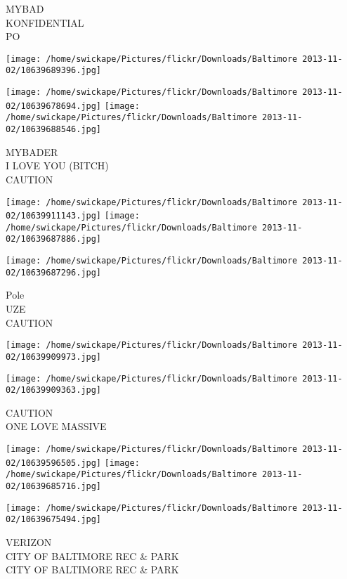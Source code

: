 \documentclass[10pt,letterpaper]{article}
\begin{document}
MYBAD\\
KONFIDENTIAL\\
PO
\pagebreak

\texttt{[image: /home/swickape/Pictures/flickr/Downloads/Baltimore 2013-11-02/10639689396.jpg]}

\vspace{0.25in}
\texttt{[image: /home/swickape/Pictures/flickr/Downloads/Baltimore 2013-11-02/10639678694.jpg]}
\texttt{[image: /home/swickape/Pictures/flickr/Downloads/Baltimore 2013-11-02/10639688546.jpg]}

MYBADER\\
I LOVE YOU (BITCH)\\
CAUTION
\pagebreak

\texttt{[image: /home/swickape/Pictures/flickr/Downloads/Baltimore 2013-11-02/10639911143.jpg]}
\texttt{[image: /home/swickape/Pictures/flickr/Downloads/Baltimore 2013-11-02/10639687886.jpg]}

\vspace{0.25in}
\texttt{[image: /home/swickape/Pictures/flickr/Downloads/Baltimore 2013-11-02/10639687296.jpg]}

Pole\\
UZE\\
CAUTION
\pagebreak

\texttt{[image: /home/swickape/Pictures/flickr/Downloads/Baltimore 2013-11-02/10639909973.jpg]}

\vspace{0.25in}
\texttt{[image: /home/swickape/Pictures/flickr/Downloads/Baltimore 2013-11-02/10639909363.jpg]}

CAUTION\\
ONE LOVE MASSIVE
\pagebreak

\texttt{[image: /home/swickape/Pictures/flickr/Downloads/Baltimore 2013-11-02/10639596505.jpg]}
\texttt{[image: /home/swickape/Pictures/flickr/Downloads/Baltimore 2013-11-02/10639685716.jpg]}

\vspace{0.25in}
\texttt{[image: /home/swickape/Pictures/flickr/Downloads/Baltimore 2013-11-02/10639675494.jpg]}

VERIZON\\
CITY OF BALTIMORE REC \& PARK\\
CITY OF BALTIMORE REC \& PARK
\pagebreak
\end{document}
